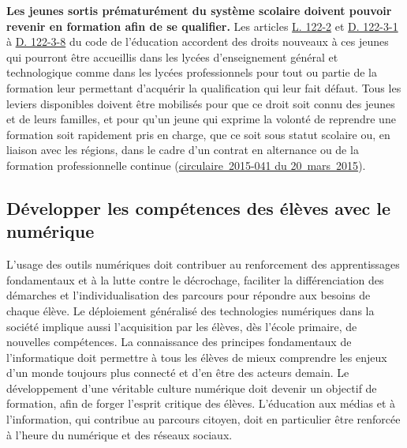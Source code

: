 \textbf{Les jeunes sortis prématurément du système scolaire doivent pouvoir revenir en formation afin de se qualifier.} Les articles \href{http://www.legifrance.gouv.fr/affichCodeArticle.do?cidTexte=LEGITEXT000006071191&idArticle=LEGIARTI000006524397}{L. 122-2} et \href{http://www.legifrance.gouv.fr/affichCodeArticle.do?cidTexte=LEGITEXT000006071191&idArticle=LEGIARTI000029852620}{D. 122-3-1} à \href{http://www.legifrance.gouv.fr/affichCodeArticle.do?cidTexte=LEGITEXT000006071191&idArticle=LEGIARTI000029852768}{D. 122-3-8} du code de l’éducation accordent des droits nouveaux à ces jeunes qui pourront être accueillis dans les lycées d’enseignement général et technologique comme dans les lycées professionnels pour tout ou partie de la formation leur permettant d’acquérir la qualification qui leur fait défaut. Tous les leviers disponibles doivent être mobilisés pour que ce droit soit connu des jeunes et de leurs familles, et pour qu’un jeune qui exprime la volonté de reprendre une formation soit rapidement pris en charge, que ce soit sous statut scolaire ou, en liaison avec les régions, dans le cadre d’un contrat en alternance ou de la formation professionnelle continue (\href{http://www.education.gouv.fr/pid25535/bulletin_officiel.html?cid_bo=86719}{circulaire~2015-041 du 20~mars~2015}).

\subsection{Développer les compétences des élèves avec le numérique}
L’usage des outils numériques doit contribuer au renforcement des apprentissages fondamentaux et à la lutte contre le décrochage, faciliter la différenciation des démarches et l’individualisation des parcours pour répondre aux besoins de chaque élève. Le déploiement généralisé des technologies numériques dans la société implique aussi l’acquisition par les élèves, dès l’école primaire, de nouvelles compétences. La connaissance des principes fondamentaux de l’informatique doit permettre à tous les élèves de mieux comprendre les enjeux d’un monde toujours plus connecté et d’en être des acteurs demain. Le développement d’une véritable culture numérique doit devenir un objectif de formation, afin de forger l’esprit critique des élèves. L’éducation aux médias et à l’information, qui contribue au parcours citoyen, doit en particulier être renforcée à l’heure du numérique et des réseaux sociaux.

